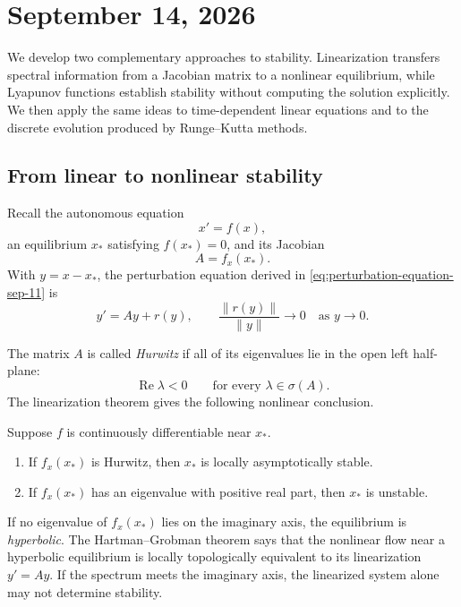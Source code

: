 \section{September 14, 2026}

We develop two complementary approaches to stability. Linearization
transfers spectral information from a Jacobian matrix to a nonlinear
equilibrium, while Lyapunov functions establish stability without
computing the solution explicitly. We then apply the same ideas to
time-dependent linear equations and to the discrete evolution produced
by Runge--Kutta methods.

\subsection{From linear to nonlinear stability}

Recall the autonomous equation
\[
  x'=f(x),
\]
an equilibrium \(x_*\) satisfying \(f(x_*)=0\), and its Jacobian
\[
  A=f_x(x_*).
\]
With \(y=x-x_*\), the perturbation equation derived in
\eqref{eq:perturbation-equation-sep-11} is
\[
  y'=Ay+r(y),
  \qquad
  \frac{\lVert r(y)\rVert}{\lVert y\rVert}\longrightarrow0
  \quad\text{as }y\to0.
\]

The matrix \(A\) is called \emph{Hurwitz} if all of its eigenvalues lie
in the open left half-plane:
\[
  \operatorname{Re}\lambda<0
  \qquad\text{for every }\lambda\in\sigma(A).
\]
The linearization theorem gives the following nonlinear conclusion.

\begin{theorem}
  Suppose \(f\) is continuously differentiable near \(x_*\).
  \begin{enumerate}[label=\textup{(\roman*)}]
    \item If \(f_x(x_*)\) is Hurwitz, then \(x_*\) is locally
      asymptotically stable.
    \item If \(f_x(x_*)\) has an eigenvalue with positive real part,
      then \(x_*\) is unstable.
  \end{enumerate}
\end{theorem}

If no eigenvalue of \(f_x(x_*)\) lies on the imaginary axis, the
equilibrium is \emph{hyperbolic}. The Hartman--Grobman theorem says that
the nonlinear flow near a hyperbolic equilibrium is locally
topologically equivalent to its linearization \(y'=Ay\). If the
spectrum meets the imaginary axis, the linearized system alone may not
determine stability.

